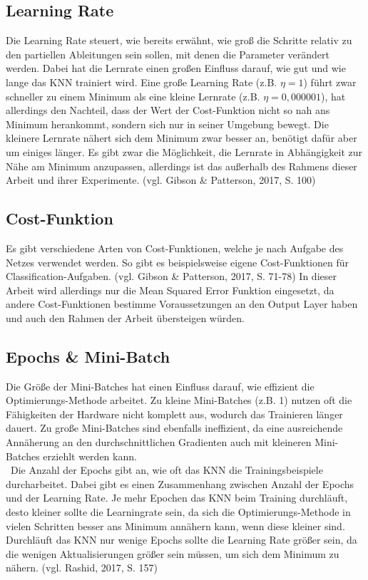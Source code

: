 \documentclass[a4paper,12pt,ngerman,oneside]{scrreprt}	%
\newcommand{\practitioner}[1]{(vgl. Gibson \& Patterson, 2017, S. {#1})}
\begin{document}
			\subsection{Learning Rate}
			Die Learning Rate steuert, wie bereits erwähnt, wie groß die Schritte relativ zu den partiellen Ableitungen sein sollen, mit denen die Parameter verändert werden. Dabei hat die Lernrate einen großen Einfluss darauf, wie gut und wie lange das KNN trainiert wird. Eine große Learning Rate (z.B. $\eta = 1$) führt zwar schneller zu einem Minimum als eine kleine Lernrate (z.B. $\eta = 0,000001$), hat allerdings den Nachteil, dass der Wert der Cost-Funktion nicht so nah ans Minimum herankommt, sondern sich nur in seiner Umgebung bewegt. Die kleinere Lernrate nähert sich dem Minimum zwar besser an, benötigt dafür aber um einiges länger. Es gibt zwar die Möglichkeit, die Lernrate in Abhängigkeit zur Nähe am Minimum anzupassen, allerdings ist das außerhalb des Rahmens dieser Arbeit und ihrer Experimente. \practitioner{100}
			\subsection{Cost-Funktion}\label{Optimierung:Cost-Funktion}
			Es gibt verschiedene Arten von Cost-Funktionen, welche je nach Aufgabe des Netzes verwendet werden. So gibt es beispielsweise eigene Cost-Funktionen für Classification-Aufgaben. \practitioner{71-78} In dieser Arbeit wird allerdings nur die Mean Squared Error Funktion eingesetzt, da andere Cost-Funktionen bestimme Voraussetzungen an den Output Layer haben und auch den Rahmen der Arbeit übersteigen würden.
			\subsection{Epochs \& Mini-Batch}\label{EpochsUndMiniBatch}
			Die Größe der Mini-Batches hat einen Einfluss darauf, wie effizient die Optimierungs-Methode arbeitet. Zu kleine Mini-Batches (z.B. 1) nutzen oft die Fähigkeiten der Hardware nicht komplett aus, wodurch das Trainieren länger dauert. Zu große Mini-Batches sind ebenfalls ineffizient, da eine ausreichende Annäherung an den durchschnittlichen Gradienten auch mit kleineren Mini-Batches erziehlt werden kann.
			\\\
			Die Anzahl der Epochs gibt an, wie oft das KNN die Trainingsbeispiele durcharbeitet. Dabei gibt es einen Zusammenhang zwischen Anzahl der Epochs und der Learning Rate. Je mehr Epochen das KNN beim Training durchläuft, desto kleiner sollte die Learningrate sein, da sich die Optimierungs-Methode in vielen Schritten besser ans Minimum annähern kann, wenn diese kleiner sind. Durchläuft das KNN nur wenige Epochs sollte die Learning Rate größer sein, da die wenigen Aktualisierungen größer sein müssen, um sich dem Minimum zu nähern. (vgl. Rashid, 2017, S. 157)
			
\end{document}
